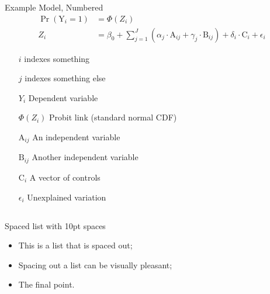 \documentclass[usenames,dvipsnames]{beamer}
\begin{document}
\begin{frame}{Example Model, Numbered}
    \begin{align} %
        \Pr(\text{Y}_{i} = 1) &= \Phi(Z_i) \\
        Z_i &=\beta_0 + \sum_{j=1}^J\left(\alpha_j\cdot\text{A}_{ij} + \gamma_j\cdot\text{B}_{ij} \right)+\delta_{i}\cdot\text{C}_{i}+\epsilon_{i}
    \end{align}
    \begin{itemize}
        \begin{itemize}
            \item [$i$] indexes something
            \item [$j$] indexes something else
        \end{itemize}
        \begin{itemize}
            \item [$Y_i$] Dependent variable
            \item [$\Phi(Z_i)$] Probit link (standard normal CDF)
            \item [$\text{A}_{ij}$] An independent variable
            \item [$\text{B}_{ij}$] Another independent variable
            \item [$\text{C}_{i}$] A vector of controls
            \item [$\epsilon_{i}$] Unexplained variation
        \end{itemize}
    \end{itemize}
\end{frame}

\subsection{}

\begin{frame}{Spaced list with 10pt spaces}
    \begin{itemize}
        \item This is a list that is spaced out;
        \vspace{10pt}
        \item Spacing out a list can be visually pleasant;
        \vspace{10pt}
        \item The final point.
    \end{itemize}  
\end{frame}
\end{document}
